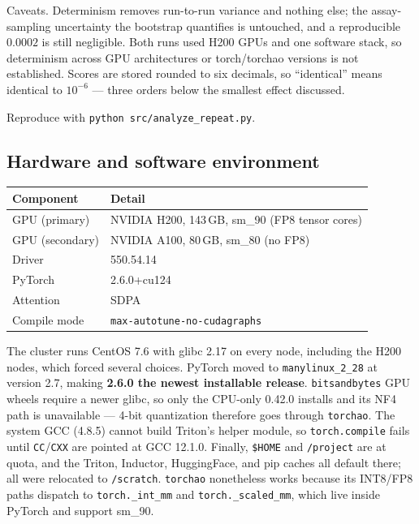 \documentclass[11pt]{article}
\begin{document}
Caveats. Determinism removes run-to-run variance and nothing else; the
assay-sampling uncertainty the bootstrap quantifies is untouched, and a
reproducible $0.0002$ is still negligible. Both runs used H200 GPUs and one
software stack, so determinism across GPU architectures or torch/torchao
versions is not established. Scores are stored rounded to six decimals, so
``identical'' means identical to $10^{-6}$ --- three orders below the smallest
effect discussed.

Reproduce with \texttt{python src/analyze\_repeat.py}.

\subsection{Hardware and software environment}

\begin{table}[htb]
\centering
\small
\begin{tabular}{ll}
\toprule
Component & Detail \\
\midrule
GPU (primary)  & NVIDIA H200, 143\,GB, sm\_90 (FP8 tensor cores) \\
GPU (secondary)& NVIDIA A100, 80\,GB, sm\_80 (no FP8) \\
Driver         & 550.54.14 \\
PyTorch        & 2.6.0+cu124 \\
Attention      & SDPA \\
Compile mode   & \texttt{max-autotune-no-cudagraphs} \\
\bottomrule
\end{tabular}
\end{table}

The cluster runs CentOS 7.6 with glibc 2.17 on every node, including the H200
nodes, which forced several choices. PyTorch moved to \texttt{manylinux\_2\_28}
at version 2.7, making \textbf{2.6.0 the newest installable release}.
\texttt{bitsandbytes} GPU wheels require a newer glibc, so only the CPU-only
0.42.0 installs and its NF4 path is unavailable --- 4-bit quantization therefore
goes through \texttt{torchao}. The system GCC (4.8.5) cannot build Triton's
helper module, so \texttt{torch.compile} fails until \texttt{CC}/\texttt{CXX}
are pointed at GCC 12.1.0. Finally, \texttt{\$HOME} and \texttt{/project} are at
quota, and the Triton, Inductor, HuggingFace, and pip caches all default there;
all were relocated to \texttt{/scratch}. \texttt{torchao} nonetheless works
because its INT8/FP8 paths dispatch to \texttt{torch.\_int\_mm} and
\texttt{torch.\_scaled\_mm}, which live inside PyTorch and support sm\_90.
\end{document}

